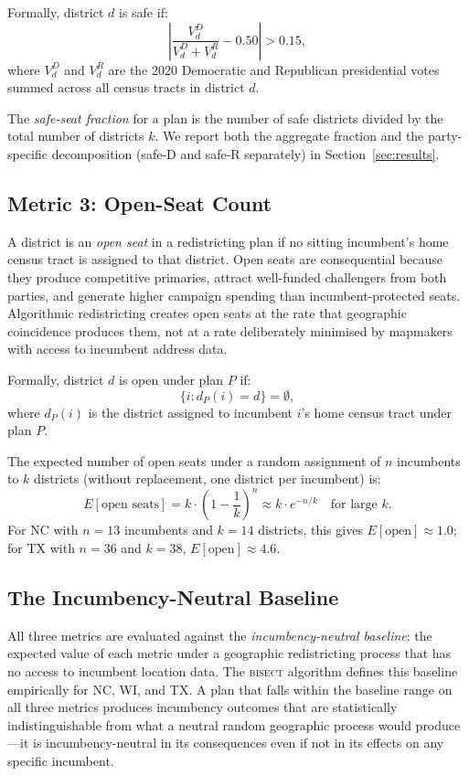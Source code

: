 Formally, district $d$ is safe if:
\[
  \left| \frac{V^D_d}{V^D_d + V^R_d} - 0.50 \right| > 0.15,
\]
where $V^D_d$ and $V^R_d$ are the 2020 Democratic and Republican presidential votes
summed across all census tracts in district $d$.

The \textit{safe-seat fraction} for a plan is the number of safe districts divided by
the total number of districts $k$. We report both the aggregate fraction and the
party-specific decomposition (safe-D and safe-R separately) in Section~\ref{sec:results}.

\subsection{Metric 3: Open-Seat Count}

A district is an \textit{open seat} in a redistricting plan if no sitting incumbent's
home census tract is assigned to that district. Open seats are consequential because
they produce competitive primaries, attract well-funded challengers from both parties,
and generate higher campaign spending than incumbent-protected seats. Algorithmic
redistricting creates open seats at the rate that geographic coincidence produces them,
not at a rate deliberately minimised by mapmakers with access to incumbent address data.

Formally, district $d$ is open under plan $P$ if:
\[
  \{i : d_P(i) = d\} = \emptyset,
\]
where $d_P(i)$ is the district assigned to incumbent $i$'s home census tract under plan $P$.

The expected number of open seats under a random assignment of $n$ incumbents to $k$
districts (without replacement, one district per incumbent) is:
\[
  E[\text{open seats}] = k \cdot \left(1 - \frac{1}{k}\right)^n \approx k \cdot e^{-n/k}
  \quad \text{for large } k.
\]
For NC with $n = 13$ incumbents and $k = 14$ districts, this gives $E[\text{open}] \approx 1.0$;
for TX with $n = 36$ and $k = 38$, $E[\text{open}] \approx 4.6$.

\subsection{The Incumbency-Neutral Baseline}

All three metrics are evaluated against the \textit{incumbency-neutral baseline}: the
expected value of each metric under a geographic redistricting process that has no access
to incumbent location data. The \textsc{bisect} algorithm defines this baseline empirically
for NC, WI, and TX. A plan that falls within the baseline range on all three metrics
produces incumbency outcomes that are statistically indistinguishable from what a neutral
random geographic process would produce---it is incumbency-neutral in its consequences
even if not in its effects on any specific incumbent.


